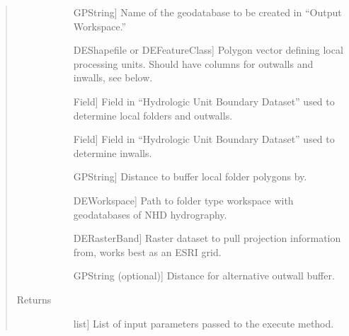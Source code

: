 \documentclass[letterpaper,10pt,english]{sphinxmanual}
\begin{document}
\begin{fulllineitems}
\begin{fulllineitems}
\begin{quote}
\begin{description}
\begin{description}
\item[{}] \leavevmode{[}GPString{]}
Name of the geodatabase to be created in “Output Workspace.”

\item[{}] \leavevmode{[}DEShapefile or DEFeatureClass{]}
Polygon vector defining local processing units. Should have columns for outwalls and inwalls, see below.

\item[{}] \leavevmode{[}Field{]}
Field in “Hydrologic Unit Boundary Dataset” used to determine local folders and outwalls.

\item[{}] \leavevmode{[}Field{]}
Field in “Hydrologic Unit Boundary Dataset” used to determine inwalls.

\item[{}] \leavevmode{[}GPString{]}
Distance to buffer local folder polygons by.

\item[{}] \leavevmode{[}DEWorkspace{]}
Path to folder type workspace with geodatabases of NHD hydrography.

\item[{}] \leavevmode{[}DERasterBand{]}
Raster dataset to pull projection information from, works best as an ESRI grid.

\item[{}] \leavevmode{[}GPString (optional){]}
Distance for alternative outwall buffer.

\end{description}

\item[{Returns}] \leavevmode\begin{description}
\item[{}] \leavevmode{[}list{]}
List of input parameters passed to the execute method.

\end{description}

\end{description}\end{quote}

\end{fulllineitems}


\end{fulllineitems}
\end{document}
